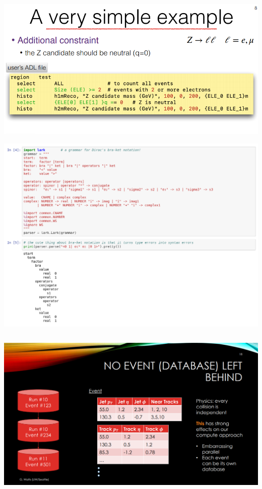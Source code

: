 \documentclass[aspectratio=169]{beamer}
\begin{document}
\begin{frame}{}
\begin{center}
\includegraphics[width=\linewidth]{slides-03.png}
\end{center}
\end{frame}

\begin{frame}{}
\vspace{-0.35 cm}
\begin{center}
\includegraphics[height=9.2 cm]{slides-04.png}
\end{center}
\end{frame}

\begin{frame}{}
\vspace{-0.5 cm}
\begin{columns}
\includegraphics[width=\linewidth]{slides-05.png}
\end{columns}
\end{frame}
\end{document}
